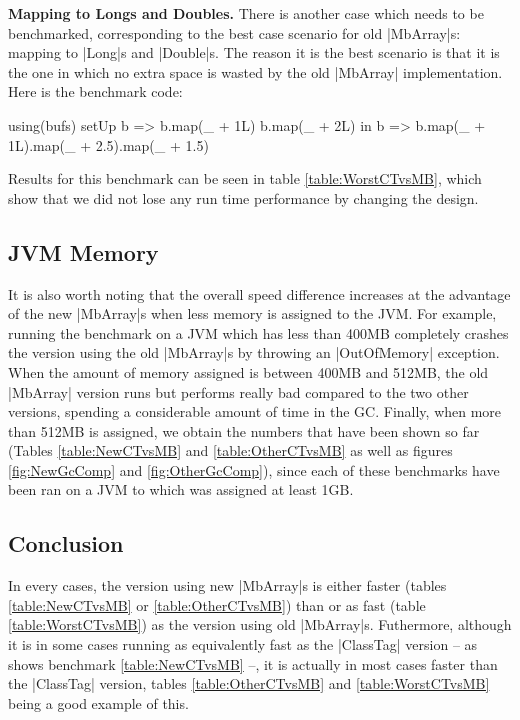 \textbf{Mapping to Longs and Doubles.} There is another case which needs to be benchmarked, corresponding to the best case scenario for old |MbArray|s: mapping to |Long|s and |Double|s. The reason it is the best scenario is that it is the one in which no extra space is wasted by the old |MbArray| implementation. Here is the benchmark code:

\begin{lstlisting-nobreak}
  using(bufs) setUp {
    b => 
      b.map(_ + 1L)
      b.map(_ + 2L)
  } in {
    b => b.map(_ + 1L).map(_ + 2.5).map(_ + 1.5)
  }
\end{lstlisting-nobreak}

Results for this benchmark can be seen in table \ref{table:WorstCTvsMB}, which show that we did not lose any run time performance by changing the design.

\subsection{JVM Memory}

It is also worth noting that the overall speed difference increases at the advantage of the new |MbArray|s when less memory is assigned to the JVM. For example, running the benchmark on a JVM which has less than 400MB completely crashes the version using the old |MbArray|s by throwing an |OutOfMemory| exception. When the amount of memory assigned is between 400MB and 512MB, the old |MbArray| version runs but performs really bad compared to the two other versions, spending a considerable amount of time in the GC. Finally, when more than 512MB is assigned, we obtain the numbers that have been shown so far (Tables \ref{table:NewCTvsMB} and \ref{table:OtherCTvsMB} as well as figures \ref{fig:NewGcComp} and \ref{fig:OtherGcComp}), since each of these benchmarks have been ran on a JVM to which was assigned at least 1GB.

\subsection{Conclusion}

In every cases, the version using new |MbArray|s is either faster (tables \ref{table:NewCTvsMB} or \ref{table:OtherCTvsMB}) than or as fast (table \ref{table:WorstCTvsMB}) as the version using old |MbArray|s. Futhermore, although it is in some cases running as equivalently fast as the |ClassTag| version -- as shows benchmark \ref{table:NewCTvsMB} --, it is actually in most cases faster than the |ClassTag| version, tables \ref{table:OtherCTvsMB} and \ref{table:WorstCTvsMB} being a good example of this. 

